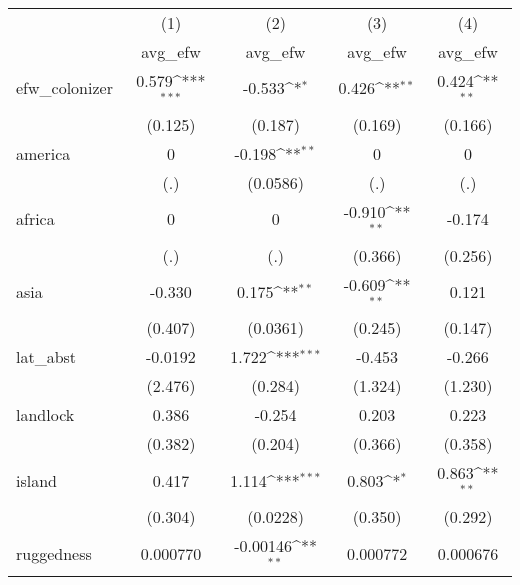 {
\def\sym#1{\ifmmode^{#1}\else\(^{#1}\)\fi}
\begin{tabular}{l*{4}{c}}
\hline\hline
            &\multicolumn{1}{c}{(1)}&\multicolumn{1}{c}{(2)}&\multicolumn{1}{c}{(3)}&\multicolumn{1}{c}{(4)}\\
            &\multicolumn{1}{c}{avg\_efw}&\multicolumn{1}{c}{avg\_efw}&\multicolumn{1}{c}{avg\_efw}&\multicolumn{1}{c}{avg\_efw}\\
\hline
efw\_colonizer&       0.579\sym{***}&      -0.533\sym{*}  &       0.426\sym{**} &       0.424\sym{**} \\
            &     (0.125)         &     (0.187)         &     (0.169)         &     (0.166)         \\
[1em]
america     &           0         &      -0.198\sym{**} &           0         &           0         \\
            &         (.)         &    (0.0586)         &         (.)         &         (.)         \\
[1em]
africa      &           0         &           0         &      -0.910\sym{**} &      -0.174         \\
            &         (.)         &         (.)         &     (0.366)         &     (0.256)         \\
[1em]
asia        &      -0.330         &       0.175\sym{**} &      -0.609\sym{**} &       0.121         \\
            &     (0.407)         &    (0.0361)         &     (0.245)         &     (0.147)         \\
[1em]
lat\_abst    &     -0.0192         &       1.722\sym{***}&      -0.453         &      -0.266         \\
            &     (2.476)         &     (0.284)         &     (1.324)         &     (1.230)         \\
[1em]
landlock    &       0.386         &      -0.254         &       0.203         &       0.223         \\
            &     (0.382)         &     (0.204)         &     (0.366)         &     (0.358)         \\
[1em]
island      &       0.417         &       1.114\sym{***}&       0.803\sym{*}  &       0.863\sym{**} \\
            &     (0.304)         &    (0.0228)         &     (0.350)         &     (0.292)         \\
[1em]
ruggedness  &    0.000770         &    -0.00146\sym{**} &    0.000772         &    0.000676         \\

\end{tabular}}

